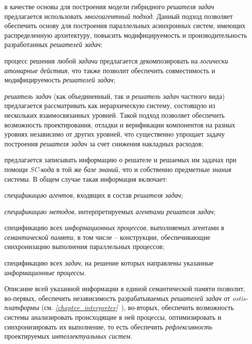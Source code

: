 \begin{textitemize}
\item в качестве основы для построения модели гибридного \textit{решателя задач} предлагается использовать \textit{многоагентный подход}. Данный подход позволяет обеспечить основу для построения параллельных асинхронных систем, имеющих распределенную архитектуру, повысить модифицируемость и производительность разработанных \textit{решателей задач};
\item процесс решения любой \textit{задачи} предлагается декомпозировать на \textit{логически атомарные действия}, что также позволит обеспечить совместимость и модифицируемость \textit{решателей задач};
\item \textit{решатель задач} (как объединенный, так и \textit{решатель задач} частного вида) предлагается рассматривать как иерархическую систему, состоящую из нескольких взаимосвязанных уровней. Такой подход позволяет обеспечить возможность проектирования, отладки и верификации компонентов на разных уровнях независимо от других уровней, что существенно упрощает задачу построения \textit{решателя задач} за счет снижения накладных расходов;
\item предлагается записывать  информацию о решателе и решаемых им задачах при помощи \textit{SC-кода} в той же \textit{базе знаний}, что и собственно предметные \textit{знания} системы. В общем случае такая информация включает: 

	\begin{textitemize}
	\item \textit{спецификацию агентов}, входящих в состав \textit{решателя задач}; 
	\item \textit{спецификацию методов}, интерпретируемых \textit{агентами} \textit{решателя задач}; 
	\item спецификацию всех \textit{информационных процессов}, выполняемых агентами в \textit{семантической памяти}, в том числе -- конструкции, обеспечивающие синхронизацию выполнения параллельных процессов;
	\item спецификацию всех \textit{задач}, на решение которых направлены указанные \textit{информационные процессы}. 
	\end{textitemize}

Описание всей указанной информации в единой семантической  памяти позволит, во-первых, обеспечить независимость разрабатываемых \textit{решателей задач} от \textit{ostis-платформы} (см. \textit{\ref{chapter_interpreter}~}), во-вторых, обеспечить возможность системы анализировать происходящие в ней процессы, оптимизировать и синхронизировать их выполнение, то есть обеспечить \textit{рефлексивность} проектируемых \textit{интеллектуальных систем}.
\end{textitemize}

